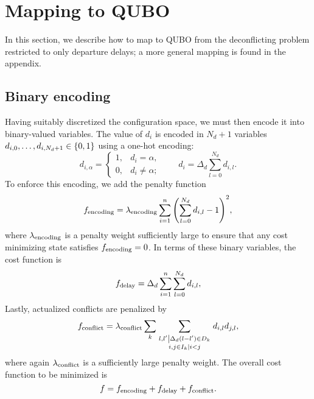 \section{Mapping to QUBO}
In this section, we describe how to map to QUBO from the deconflicting problem restricted to only departure delays; a more general mapping is found in the appendix.

\subsection{Binary encoding}
Having suitably discretized the configuration space, we must then encode it into binary-valued variables.
The value of $d_i$ is encoded in $N_d + 1$ variables $d_{i,0}, \ldots, d_{i,N_d + 1} \in {\{0, 1\}}$ using a one-hot encoding:
\begin{equation}
d_{i, \alpha} = \begin{cases}
1, & d_i = \alpha,\\
0, & d_i \neq \alpha;
\end{cases}
\qquad
d_i = \Delta_d \sum_{l = 0}^{N_d} d_{i,l}.
\end{equation}
To enforce this encoding, we add the penalty function
\begin{equation}
f_{\mathrm{encoding}} = 
\lambda_{\mathrm{encoding}} 
\sum_{i = 1}^n 
{\left(
\sum_{l = 0}^{N_d} d_{i,l} - 1
\right)}^2,
\end{equation}
where $\lambda_{\mathrm{encoding}}$ is a penalty weight sufficiently large to ensure that any cost minimizing state satisfies $f_{\mathrm{encoding}} = 0$.
In terms of these binary variables, the cost function is 
\begin{equation}
f_{\mathrm{delay}} = 
\Delta_d
\sum_{i=1}^n 
\sum_{l=0}^{N_d} d_{i,l},
\end{equation}
Lastly, actualized conflicts are penalized by 
\begin{equation}
  f_{\mathrm{conflict}}
=
\lambda_{\mathrm{conflict}}
\sum_{k}
\sum_{\substack{\left.l, l' \middle| \Delta_d (l - l') \in D_k\right.\\
\left. i, j \in I_k \middle| i < j \right.}}
  d_{i,l} d_{j, l},
\end{equation}
where again $\lambda_{\mathrm{conflict}}$ is a sufficiently large penalty weight. 
The overall cost function to be minimized is 
\begin{equation}
f
=
f_{\mathrm{encoding}} + f_{\mathrm{delay}} + f_{\mathrm{conflict}}.
\end{equation}



